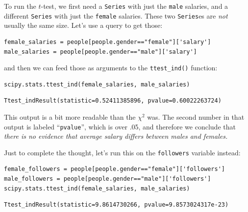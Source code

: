 To run the $t$-test, we first need a \texttt{Series} with just the
\texttt{male} salaries, and a different \texttt{Series} with just the
\texttt{female} salaries. These two \texttt{Series}es are \textit{not} usually
the same size. Let's use a query to get those:

\begin{Verbatim}[fontsize=\footnotesize,samepage=true,frame=single,framesep=3mm]
female_salaries = people[people.gender=="female"]['salary']
male_salaries = people[people.gender=="male"]['salary']
\end{Verbatim}
\vspace{-.2in}



and then we can feed those as arguments to the \texttt{ttest\_ind()} function:

\begin{Verbatim}[fontsize=\small,samepage=true,frame=single,framesep=3mm]
scipy.stats.ttest_ind(female_salaries, male_salaries)
\end{Verbatim}
\vspace{-.2in}

\begin{Verbatim}[fontsize=\footnotesize,samepage=true,frame=leftline,framesep=5mm,framerule=1mm]
Ttest_indResult(statistic=0.52411385896, pvalue=0.60022263724)
\end{Verbatim}

This output is a bit more readable than the $\chi^2$ was. The second number in
that output is labeled ``\texttt{pvalue}'', which is over .05, and therefore we
conclude that \textit{there is no evidence that average salary differs between
males and females.}

Just to complete the thought, let's run this on the \texttt{followers} variable
instead:

\begin{Verbatim}[fontsize=\footnotesize,samepage=true,frame=single,framesep=3mm]
female_followers = people[people.gender=="female"]['followers']
male_followers = people[people.gender=="male"]['followers']
scipy.stats.ttest_ind(female_salaries, male_salaries)
\end{Verbatim}
\vspace{-.2in}

\begin{Verbatim}[fontsize=\footnotesize,samepage=true,frame=leftline,framesep=5mm,framerule=1mm]
Ttest_indResult(statistic=9.8614730266, pvalue=9.8573024317e-23)
\end{Verbatim}

